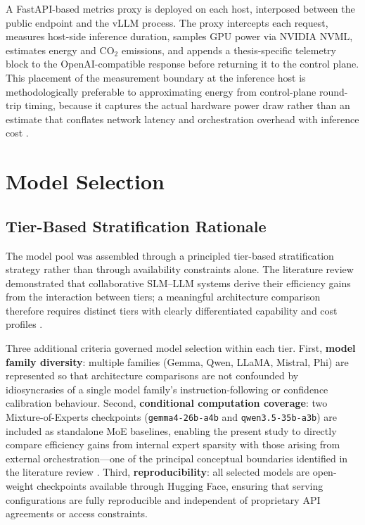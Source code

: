 A FastAPI-based metrics proxy is deployed on each host, interposed between the public endpoint and the vLLM process. The proxy intercepts each request, measures host-side inference duration, samples GPU power via NVIDIA NVML, estimates energy and CO$_2$ emissions, and appends a thesis-specific telemetry block to the OpenAI-compatible response before returning it to the control plane. This placement of the measurement boundary at the inference host is methodologically preferable to approximating energy from control-plane round-trip timing, because it captures the actual hardware power draw rather than an estimate that conflates network latency and orchestration overhead with inference cost \cite{energytoken2025}.

\section{Model Selection}
\label{sec:models}

\subsection{Tier-Based Stratification Rationale}

The model pool was assembled through a principled tier-based stratification strategy rather than through availability constraints alone. The literature review demonstrated that collaborative SLM--LLM systems derive their efficiency gains from the interaction between tiers; a meaningful architecture comparison therefore requires distinct tiers with clearly differentiated capability and cost profiles \cite{slrmanuscript2026, hao2024hybrid, oh2025uncertainty}.

Three additional criteria governed model selection within each tier. First, \textbf{model family diversity}: multiple families (Gemma, Qwen, LLaMA, Mistral, Phi) are represented so that architecture comparisons are not confounded by idiosyncrasies of a single model family's instruction-following or confidence calibration behaviour. Second, \textbf{conditional computation coverage}: two Mixture-of-Experts checkpoints (\texttt{gemma4-26b-a4b} and \texttt{qwen3.5-35b-a3b}) are included as standalone MoE baselines, enabling the present study to directly compare efficiency gains from internal expert sparsity with those arising from external orchestration---one of the principal conceptual boundaries identified in the literature review \cite{slrmanuscript2026}. Third, \textbf{reproducibility}: all selected models are open-weight checkpoints available through Hugging Face, ensuring that serving configurations are fully reproducible and independent of proprietary API agreements or access constraints.

